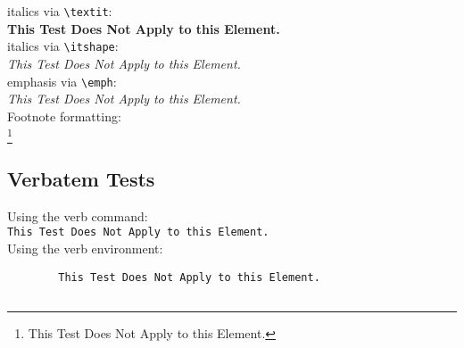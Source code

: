 \documentclass{ximera}
\begin{document}
        italics via \verb|\textit|:\\
        \textbf{This Test Does Not Apply to this Element.}\\
        italics via \verb|\itshape|:\\
        {\itshape This Test Does Not Apply to this Element.}\\

        emphasis via \verb|\emph|:\\
        \emph{This Test Does Not Apply to this Element.}\\

        Footnote formatting:\\
        \footnote{This Test Does Not Apply to this Element.}

    \subsection{Verbatem Tests}
        Using the verb command:\\
        \verb|This Test Does Not Apply to this Element.|\\
        Using the verb environment:\\
        \begin{verbatim}
        This Test Does Not Apply to this Element.
        \end{verbatim}

    \subsection{}


\hrulefill
\end{document}
